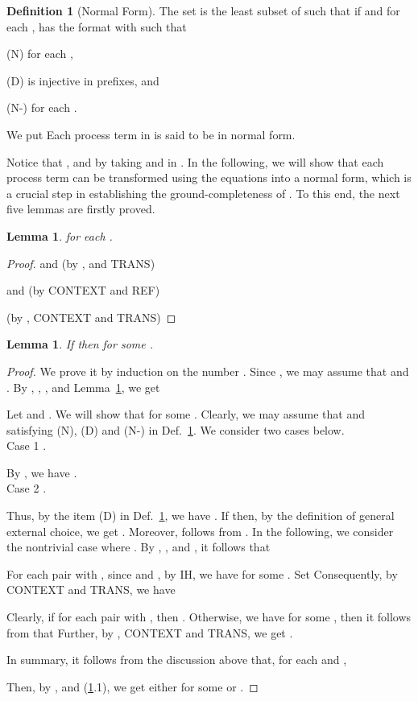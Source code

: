 \documentclass{elsarticle}
\theoremstyle{plain}
\newtheorem{lemma}[theorem]{Lemma}
\theoremstyle{definition}
\newtheorem{mydefn}[theorem]{Definition}
\begin{document}
\begin{mydefn}[Normal Form]\label{D:NORMAL_FORM}
    The set  is the least subset of  such that  if  and for each ,  has the format  with  such that

        \noindent (N)\;\;\;   for each ,

        \noindent (D) \;\;  is injective in prefixes, and

        \noindent (N-)   for each .

We put 
Each process term in  is said to be  in normal form.
\end{mydefn}

Notice that , and  by taking  and  in .
In the following, we will show that each process term can be transformed using the equations into a normal form, which is a crucial step in establishing the ground-completeness of .
To this end, the next five lemmas are firstly proved.

\begin{lemma}\label{L:DIS_INEQUATION}
   for each .
\end{lemma}
\begin{proof}
   and   \qquad\qquad\qquad(by ,  and TRANS)

\noindent    and  (by CONTEXT and REF)

\noindent   \qquad \qquad (by , CONTEXT and TRANS)
\end{proof}

\begin{lemma}\label{L:COMP_CONJ}
  If  then  for some .
\end{lemma}
\begin{proof}
We prove it by induction on the number .
  Since , we may assume that  and .
   By , , ,  and Lemma~\ref{L:DIS_INEQUATION}, we get
   
    Let  and . We will show that  for some . Clearly, we may assume that  and  satisfying (N), (D) and (N-) in Def.~\ref{D:NORMAL_FORM}. We consider two cases below.\\


    \noindent Case 1 .

          By  , we have .\\

    \noindent Case 2  .

        Thus, by the item (D) in Def.~\ref{D:NORMAL_FORM}, we have .
        If  then, by the definition of general external choice, we get .
        Moreover,  follows from .
        In the following, we consider the nontrivial case where .
        By , ,  and , it follows that
        
         For each pair   with ,
         since  and , by IH, we have  for some  .
         Set 
        Consequently, by  CONTEXT and TRANS, we have
            
        Clearly, if  for each pair  with  , then .
        Otherwise, we have  for some , then it follows from  that 
        Further, by , CONTEXT and TRANS, we get .

     In summary, it follows from the discussion above that, for each  and ,
     
     Then, by ,  and (\ref{L:COMP_CONJ}.1), we get either  for some  or .
\end{proof}
\end{document}
